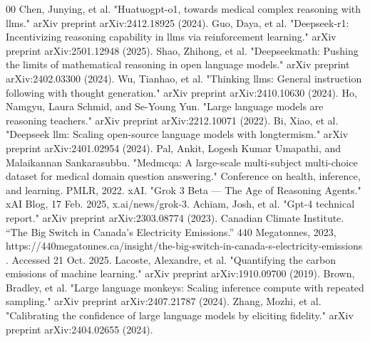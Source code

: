 \documentclass[conference]{IEEEtran}
\begin{document}
\begin{thebibliography}{00}
             Chen, Junying, et al. "Huatuogpt-o1, towards medical complex reasoning with llms." arXiv preprint arXiv:2412.18925 (2024).
             Guo, Daya, et al. "Deepseek-r1: Incentivizing reasoning capability in llms via reinforcement learning." arXiv preprint arXiv:2501.12948 (2025).
             Shao, Zhihong, et al. "Deepseekmath: Pushing the limits of mathematical reasoning in open language models." arXiv preprint arXiv:2402.03300 (2024).
             Wu, Tianhao, et al. "Thinking llms: General instruction following with thought generation." arXiv preprint arXiv:2410.10630 (2024).
             Ho, Namgyu, Laura Schmid, and Se-Young Yun. "Large language models are reasoning teachers." arXiv preprint arXiv:2212.10071 (2022).
             Bi, Xiao, et al. "Deepseek llm: Scaling open-source language models with longtermism." arXiv preprint arXiv:2401.02954 (2024).
             Pal, Ankit, Logesh Kumar Umapathi, and Malaikannan Sankarasubbu. "Medmcqa: A large-scale multi-subject multi-choice dataset for medical domain question answering." Conference on health, inference, and learning. PMLR, 2022.
             xAI. "Grok 3 Beta — The Age of Reasoning Agents." xAI Blog, 17 Feb. 2025, x.ai/news/grok-3.
             Achiam, Josh, et al. "Gpt-4 technical report." arXiv preprint arXiv:2303.08774 (2023).
             Canadian Climate Institute. “The Big Switch in Canada’s Electricity Emissions.” 440 Megatonnes, 2023, https://440megatonnes.ca/insight/the-big-switch-in-canada-s-electricity-emissions
. Accessed 21 Oct. 2025.
             Lacoste, Alexandre, et al. "Quantifying the carbon emissions of machine learning." arXiv preprint arXiv:1910.09700 (2019).
             Brown, Bradley, et al. "Large language monkeys: Scaling inference compute with repeated sampling." arXiv preprint arXiv:2407.21787 (2024).
             Zhang, Mozhi, et al. "Calibrating the confidence of large language models by eliciting fidelity." arXiv preprint arXiv:2404.02655 (2024).
            
         
	\end{thebibliography}
	
	
\end{document}
